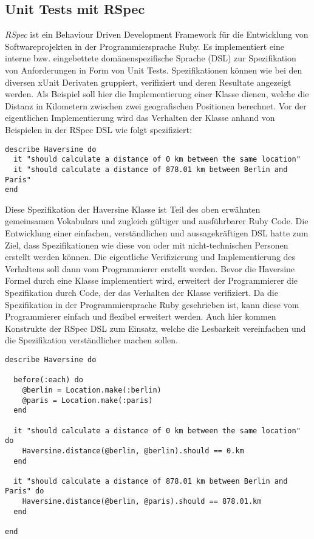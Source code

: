 \subsection{Unit Tests mit RSpec}

\textit{RSpec} \cite{rspec} ist ein Behaviour Driven Development
Framework für die Entwicklung von Softwareprojekten in der
Programmiersprache Ruby.  Es implementiert eine interne
bzw. eingebettete domänen\-spezifische Sprache (DSL) zur Spezifikation
von Anforderungen in Form von Unit Tests.  Spezifikationen können wie
bei den diversen xUnit Derivaten gruppiert, verifiziert und deren
Resultate angezeigt werden. Als Beispiel soll hier die Implementierung
einer Klasse dienen, welche die Distanz in Kilometern zwischen zwei
geografischen Positionen berechnet. Vor der eigentlichen
Implementierung wird das Verhalten der Klasse anhand von Beispielen in
der RSpec DSL wie folgt spezifiziert:

\begin{lstlisting}
describe Haversine do
  it "should calculate a distance of 0 km between the same location"
  it "should calculate a distance of 878.01 km between Berlin and Paris"
end
\end{lstlisting}

Diese Spezifikation der Haversine Klasse ist Teil des oben erwähnten
gemeinsamen Vokabulars und zugleich gültiger und ausführbarer Ruby
Code. Die Entwicklung einer einfachen, verständlichen und
aussagekräftigen DSL hatte zum Ziel, dass Spezifikationen wie diese
von oder mit nicht-technischen Personen erstellt werden können. Die
eigentliche Verifizierung und Implementierung des Verhaltens soll dann
vom Programmierer erstellt werden. Bevor die Haversine Formel durch
eine Klasse implementiert wird, erweitert der Programmierer die
Spezifikation durch Code, der das Verhalten der Klasse verifiziert. Da
die Spezifikation in der Programmiersprache Ruby geschrieben ist, kann
diese vom Programmierer einfach und flexibel erweitert werden. Auch
hier kommen Konstrukte der RSpec DSL zum Einsatz, welche die
Lesbarkeit vereinfachen und die Spezifikation verständlicher machen
sollen.

\begin{lstlisting}
describe Haversine do

  before(:each) do
    @berlin = Location.make(:berlin)
    @paris = Location.make(:paris)
  end

  it "should calculate a distance of 0 km between the same location" do
    Haversine.distance(@berlin, @berlin).should == 0.km
  end

  it "should calculate a distance of 878.01 km between Berlin and Paris" do
    Haversine.distance(@berlin, @paris).should == 878.01.km
  end

end
\end{lstlisting}

